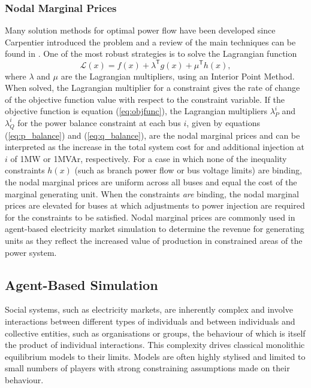 \subsubsection{Nodal Marginal Prices}
Many solution methods for optimal power flow have been developed
since Carpentier introduced the problem and a review of the main techniques
can be found in .  One of the most robust
strategies is to solve the Lagrangian function
\begin{equation}
\mathcal{L}(x) = f(x) + \lambda^\mathsf{T}g(x) + \mu^\mathsf{T}h(x),
\end{equation}
where $\lambda$ and $\mu$ are the Lagrangian multipliers, using an Interior
Point Method.  When solved, the Lagrangian multiplier for a constraint gives
the rate of change of the objective function value with respect to the
constraint variable.  If the objective function is equation (\ref{eq:objfunc}), the Lagrangian
multipliers $\lambda^i_P$ and $\lambda^i_Q$ for the power balance constraint at
each bus $i$, given by equations (\ref{eq:p_balance}) and (\ref{eq:q_balance}),
are the nodal marginal prices and can be interpreted as the increase in the
total system cost for and additional injection at $i$ of 1MW or 1MVAr,
respectively.  For a case in which none of the inequality constraints $h(x)$
(such as branch power flow or bus voltage limits) are binding, the nodal
marginal prices are uniform across all buses and equal the cost of the
marginal generating unit.  When the constraints \textit{are} binding, the nodal
marginal prices are elevated for buses at which adjustments to power injection
are required for the constraints to be satisfied.  Nodal marginal prices are
commonly used in agent-based electricity market simulation to determine the
revenue for generating units as they reflect the increased value of production in
constrained areas of the power system.

\subsection{Agent-Based Simulation}
Social systems, such as electricity markets, are inherently complex and involve
interactions between different types of individuals and between individuals
and collective entities, such as organisations or groups, the behaviour of which
is itself the product of individual interactions.  This complexity
drives classical monolithic equilibrium models to their limits.  Models are
often highly stylised and limited to small numbers of players with strong
constraining assumptions made on their behaviour.

